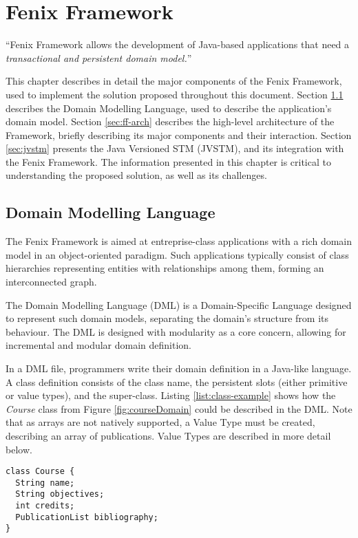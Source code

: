 \chapter{Fenix Framework}
\label{chap:ff}

``Fenix Framework allows the development of Java-based applications
that need a {\it transactional and persistent domain model.}''

This chapter describes in detail the major components of the Fenix
Framework, used to implement the solution proposed throughout this
document. Section \ref{sec:dml} describes the Domain Modelling
Language, used to describe the application's domain model. Section
\ref{sec:ff-arch} describes the high-level architecture of the
Framework, briefly describing its major components and their
interaction. Section \ref{sec:jvstm} presents the Java Versioned STM
(JVSTM), and its integration with the Fenix Framework. The information
presented in this chapter is critical to understanding the proposed
solution, as well as its challenges.

\section{Domain Modelling Language}
\label{sec:dml}

The Fenix Framework is aimed at entreprise-class applications with a
rich domain model in an object-oriented paradigm. Such applications
typically consist of class hierarchies representing entities with
relationships among them, forming an interconnected graph. 

The Domain Modelling Language (DML) is a Domain-Specific Language
designed to represent such domain models, separating the domain's
structure from its behaviour. The DML is designed with modularity as a
core concern, allowing for incremental and modular domain definition.

In a DML file, programmers write their domain definition in a
Java-like language. A class definition consists of the class name, the
persistent slots (either primitive or value types), and the
super-class. Listing \ref{list:class-example} shows how the {\it
  Course} class from Figure \ref{fig:courseDomain} could be described
in the DML. Note that as arrays are not natively supported, a Value
Type must be created, describing an array of publications. Value Types
are described in more detail below.

\begin{lstlisting}[caption={DML for the {\it Course} class},
  label={list:class-example}]
class Course {
  String name;
  String objectives;
  int credits;
  PublicationList bibliography;
}
\end{lstlisting}

